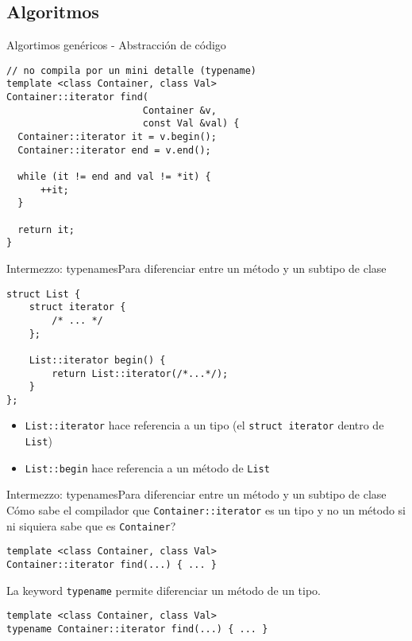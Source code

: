 \subsection{Algoritmos}
\begin{frame}[fragile]{Algortimos gen\'ericos - Abstracci\'on de c\'odigo}
      \begin{lstlisting}[style=normal]
// no compila por un mini detalle (typename)
template <class Container, class Val>
Container::iterator find(
                        Container &v,
                        const Val &val) {
  Container::iterator it = v.begin();
  Container::iterator end = v.end();

  while (it != end and val != *it) {
      ++it;
  }

  return it;
}
      \end{lstlisting}
\end{frame}
\begin{frame}[fragile]{Intermezzo: typenames}{Para diferenciar entre un m\'etodo y un subtipo de clase}
      \begin{lstlisting}[style=normal]
struct List {
    struct iterator {
        /* ... */
    };

    List::iterator begin() {
        return List::iterator(/*...*/);
    }
};
      \end{lstlisting}
      \begin{itemize}
          \item \lstinline[style=normal]!List::iterator! hace referencia a un tipo (el \lstinline[style=normal]!struct iterator! dentro de \lstinline[style=normal]!List!)
          \item \lstinline[style=normal]!List::begin! hace referencia a un m\'etodo de \lstinline[style=normal]!List!
      \end{itemize}
\end{frame}


\begin{frame}[fragile]{Intermezzo: typenames}{Para diferenciar entre un m\'etodo y un subtipo de clase}
C\'omo sabe el compilador que \lstinline[style=normal]!Container::iterator! es un tipo y no un m\'etodo si ni siquiera sabe que es \lstinline[style=normal]!Container!?
      \begin{lstlisting}[style=normal]
template <class Container, class Val>
Container::iterator find(...) { ... }
      \end{lstlisting}
\pause
La keyword \lstinline[style=normal]!typename! permite diferenciar un m\'etodo de un tipo.
      \begin{lstlisting}[style=normal]
template <class Container, class Val>
typename Container::iterator find(...) { ... }
      \end{lstlisting}
\end{frame}


